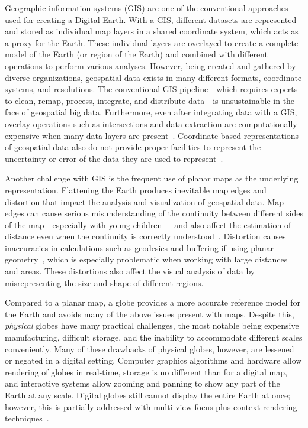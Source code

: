 Geographic information systems (GIS) are one of the conventional approaches used for creating a Digital Earth.
With a GIS, different datasets are represented and stored as individual map layers in a shared coordinate system, which acts as a proxy for the Earth.
These individual layers are overlayed to create a complete model of the Earth (or region of the Earth) and combined with different operations to perform various analyses.
However, being created and gathered by diverse organizations, geospatial data exists in many different formats, coordinate systems, and resolutions.
The conventional GIS pipeline---which requires experts to clean, remap, process, integrate, and distribute data---is unsustainable in the face of geospatial big data.
Furthermore, even after integrating data with a GIS, overlay operations such as intersections and data extraction are computationally expensive when many data layers are present~\cite{wang2015improving}.
Coordinate-based representations of geospatial data also do not provide proper facilities to represent the uncertainty or error of the data they are used to represent~\cite{goodchild2018reimagining}.


Another challenge with GIS is the frequent use of planar maps as the underlying representation.
Flattening the Earth produces inevitable map edges and distortion that impact the analysis and visualization of geospatial data.
Map edges can cause serious misunderstanding of the continuity between different sides of the map---especially with young children~\cite{hennerdal2015beyond}---and also affect the estimation of distance even when the continuity is correctly understood~\cite{hruby2016journey}.
Distortion causes inaccuracies in calculations such as geodesics and buffering if using planar geometry~\cite{flaterbuffering}, which is especially problematic when working with large distances and areas.
These distortions also affect the visual analysis of data by misrepresenting the size and shape of different regions.


Compared to a planar map, a globe provides a more accurate reference model for the Earth and avoids many of the above issues present with maps.
Despite this, \textit{physical} globes have many practical challenges, the most notable being expensive manufacturing, difficult storage, and the inability to accommodate different scales conveniently.
Many of these drawbacks of physical globes, however, are lessened or negated in a digital setting.
Computer graphics algorithms and hardware allow rendering of globes in real-time, storage is no different than for a digital map, and interactive systems allow zooming and panning to show any part of the Earth at any scale.
Digital globes still cannot display the entire Earth at once; however, this is partially addressed with multi-view focus plus context rendering techniques~\cite{sherlock2017visualizations}.


